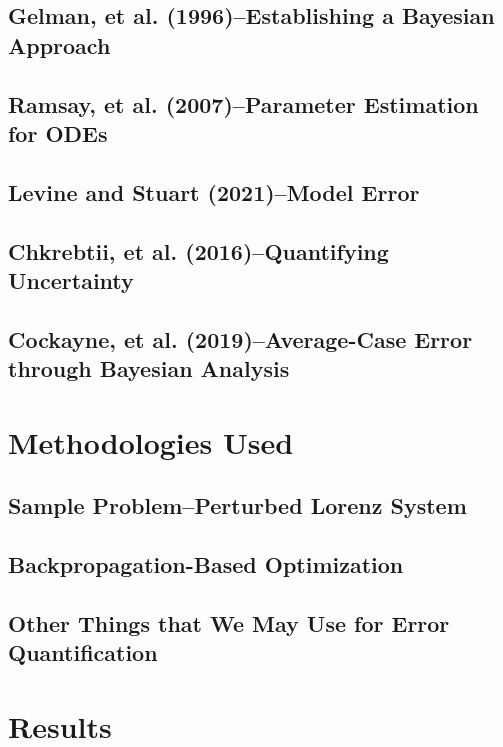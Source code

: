 \documentclass[12pt]{article}
\begin{document}
\subsection{Gelman, et al. (1996)\---Establishing a Bayesian Approach}

\subsection{Ramsay, et al. (2007)\---Parameter Estimation for ODEs}

\subsection{Levine and Stuart (2021)\---Model Error}

\subsection{Chkrebtii, et al. (2016)\---Quantifying Uncertainty}

\subsection{Cockayne, et al. (2019)\---Average-Case Error through Bayesian Analysis}




\section{}



\section{Methodologies Used}

\subsection{Sample Problem\---Perturbed Lorenz System}

\subsection{Backpropagation-Based Optimization}

\subsection{Other Things that We May Use for Error Quantification}



\section{Results}



\nocite{*}

\end{document}
